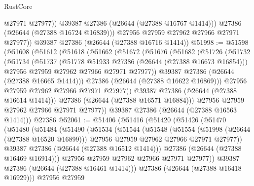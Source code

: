 \begin{lexlean}{RustCore}
\begin{coremodule}
                @27971
                @27977))
            @39387
            @27386
            (@26644 (@27388 @16767 @1414)))
          @27386
          (@26644 (@27388 @16724 @16839)))
        @27956
        @27959
        @27962
        @27966
        @27971
        @27977))
    @39387
    @27386
    (@26644 (@27388 @16716 @1414))
@51998 := @51598
    (@51608
      (@51612
        (@51618
          (@51662
            (@51672
              (@51676
                (@51682
                  (@51726
                    (@51732
                      (@51734
                        (@51737
                          (@51778 @51933 @27386 (@26644 (@27388 @16673 @16854)))
                          @27956
                          @27959
                          @27962
                          @27966
                          @27971
                          @27977))
                      @39387
                      @27386
                      (@26644 (@27388 @16665 @1414)))
                    @27386
                    (@26644 (@27388 @16622 @16869)))
                  @27956
                  @27959
                  @27962
                  @27966
                  @27971
                  @27977))
              @39387
              @27386
              (@26644 (@27388 @16614 @1414)))
            @27386
            (@26644 (@27388 @16571 @16884)))
          @27956
          @27959
          @27962
          @27966
          @27971
          @27977))
      @39387
      @27386
      (@26644 (@27388 @16563 @1414)))
    @27386
@52061 := @51406
    (@51416
      (@51420
        (@51426
          (@51470
            (@51480
              (@51484
                (@51490
                  (@51534
                    (@51544
                      (@51548
                        (@51554
                          (@51998 (@26644 (@27388 @16520 @16899)))
                          @27956
                          @27959
                          @27962
                          @27966
                          @27971
                          @27977))
                      @39387
                      @27386
                      (@26644 (@27388 @16512 @1414)))
                    @27386
                    (@26644 (@27388 @16469 @16914)))
                  @27956
                  @27959
                  @27962
                  @27966
                  @27971
                  @27977))
              @39387
              @27386
              (@26644 (@27388 @16461 @1414)))
            @27386
            (@26644 (@27388 @16418 @16929)))
          @27956
          @27959

\end{coremodule}
\end{lexlean}
